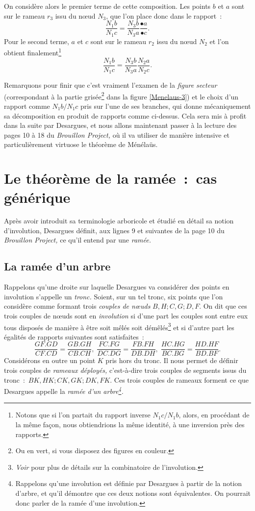 \documentclass[12pt, a4paper]{article}
\begin{document}
On considère alors le premier terme de cette composition. Les points $b$ et $a$ sont sur le rameau $r_3$ issu du n{\oe}ud $N_3$, que l'on place donc dans le rapport~:~
\[
\frac{N_1b}{N_1c}=\frac{N_3 b}{N_3 a}\frac{\bullet a}{\bullet c}.
\]
Pour le second terme, $a$ et $c$ sont sur le rameau $r_2$ issu du n{\oe}ud $N_2$ et l'on obtient finalement\footnote{Notons que si l'on partait du rapport inverse $N_1c/N_1b$, alors, en procédant de la même façon, nous obtiendrions la même identité, à une inversion près des rapports.}
\[
\frac{N_1b}{N_1c}=\frac{N_3 b}{N_3 a}\frac{N_2 a}{N_2 c}.
\]

Remarquons pour finir que c'est vraiment l'examen de la \textit{figure secteur} (correspondant à la partie grisée\footnote{Ou en vert, si vous disposez des figures en couleur.} dans la figure \ref{Menelaus-3}) et le choix d'un rapport comme $N_1b/N_1c$ pris sur l'une de ses branches, qui donne mécaniquement sa décomposition en produit de rapports comme ci-dessus. Cela sera mis à profit dans la suite par Desargues, et nous allons maintenant passer à la lecture des pages 10 à 18 du \textit{Brouillon Project,} où il va utiliser de manière intensive et particulièrement virtuose le théorème de Ménélaüs.
\section{Le théorème de la ramée~:~cas générique}
Après avoir introduit sa terminologie arboricole et étudié en détail sa notion d'involution, Desargues définit, aux lignes 9 et suivantes de la page 10 du \textit{Brouillon Project,} ce qu'il entend par une \textit{ramée.} 
\subsection{La ramée d'un arbre}
Rappelons qu'une droite sur laquelle Desargues va considérer des points en involution s'appelle un \emph{tronc.} Soient, sur un tel tronc, six points  que l'on considère comme formant trois \textit{couples de n{\oe}uds} $B,H;C,G;D,F$. On dit que ces trois couples de n{\oe}uds sont en \textit{involution} si d'une part les couples sont entre eux tous disposés de manière à être soit mêlés soit démêlés\footnote{\textit{Voir} \cite{anglade-briend-1} pour plus de détails sur la combinatoire de l'involution.} et si d'autre part les égalités de rapports suivantes sont satisfaites~:~
\[
\frac{GF.GD}{CF.CD}=\frac{GB.GH}{CB.CH},\; \frac{FC.FG}{DC.DG}=\frac{FB.FH}{DB.DH},\; \frac{HC.HG}{BC.BG}=\frac{HD.HF}{BD.BF}.
\]
Considérons en outre un point $K$ pris hors du tronc. Il nous permet de définir trois couples de \textit{rameaux déployés,} c'est-à-dire trois couples de segments issus du tronc~:~$BK,HK; CK,GK; DK,FK$. Ces trois couples de rameaux forment ce que Desargues appelle la \textit{ramée d'un arbre\footnote{Rappelons qu'une involution est définie par Desargues à partir de la notion d'arbre, et qu'il démontre que ces deux notions sont équivalentes. On pourrait donc parler de la ramée d'une involution.}.}
\end{document}
